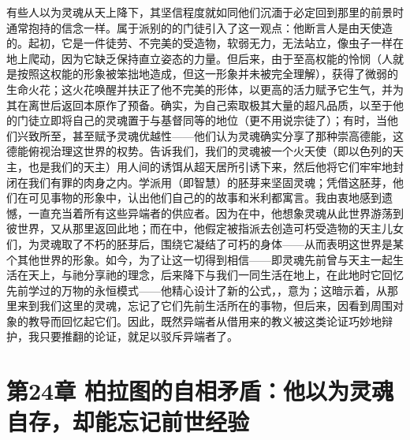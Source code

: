 有些人以为灵魂从天上降下，其坚信程度就如同他们沉湎于必定回到那里的前景时通常抱持的信念一样。属于派别的的门徒引入了这一观点：他断言人是由天使造的。起初，它是一件徒劳、不完美的受造物，软弱无力，无法站立，像虫子一样在地上爬动，因为它缺乏保持直立姿态的力量。但后来，由于至高权能的怜悯（人就是按照这权能的形象被笨拙地造成，但这一形象并未被完全理解），获得了微弱的生命火花；这火花唤醒并扶正了他不完美的形体，以更高的活力赋予它生气，并为其在离世后返回本原作了预备。确实，为自己索取极其大量的超凡品质，以至于他的门徒立即将自己的灵魂置于与基督同等的地位（更不用说宗徒了）；有时，当他们兴致所至，甚至赋予灵魂优越性——他们认为灵魂确实分享了那种崇高德能，这德能俯视治理这世界的权势。告诉我们，我们的灵魂被一个火天使（即以色列的天主，也是我们的天主）用人间的诱饵从超天居所引诱下来，然后他将它们牢牢地封闭在我们有罪的肉身之内。学派用（即智慧）的胚芽来坚固灵魂；凭借这胚芽，他们在可见事物的形象中，认出他们自己的的故事和米利都寓言。我由衷地感到遗憾，一直充当着所有这些异端者的供应者。因为在中，他想象灵魂从此世界游荡到彼世界，又从那里返回此地；而在中，他假定被指派去创造可朽受造物的天主儿女们，为灵魂取了不朽的胚芽后，围绕它凝结了可朽的身体——从而表明这世界是某个其他世界的形象。如今，为了让这一切得到相信——即灵魂先前曾与天主一起生活在天上，与祂分享祂的理念，后来降下与我们一同生活在地上，在此地时它回忆先前学过的万物的永恒模式——他精心设计了新的公式，，意为；这暗示着，从那里来到我们这里的灵魂，忘记了它们先前生活所在的事物，但后来，因看到周围对象的教导而回忆起它们。因此，既然异端者从借用来的教义被这类论证巧妙地辩护，我只要推翻的论证，就足以驳斥异端者了。\par


\section{第24章 柏拉图的自相矛盾：他以为灵魂自存，却能忘记前世经验}

